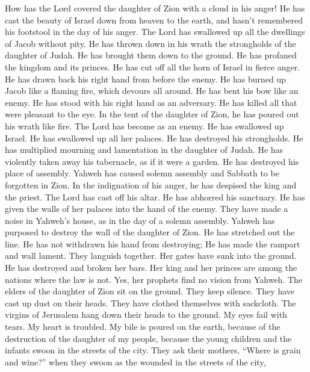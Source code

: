  How has the Lord covered the daughter of Zion with a
cloud in his anger! He has cast the beauty of Israel down from heaven to
the earth, and hasn't remembered his footstool in the day of his anger.
 The Lord has swallowed up all the dwellings of Jacob
without pity. He has thrown down in his wrath the strongholds of the
daughter of Judah. He has brought them down to the ground. He has
profaned the kingdom and its princes.  He has cut off all
the horn of Israel in fierce anger. He has drawn back his right hand
from before the enemy. He has burned up Jacob like a flaming fire, which
devours all around.  He has bent his bow like an enemy. He
has stood with his right hand as an adversary. He has killed all that
were pleasant to the eye. In the tent of the daughter of Zion, he has
poured out his wrath like fire.  The Lord has become as an
enemy. He has swallowed up Israel. He has swallowed up all her palaces.
He has destroyed his strongholds. He has multiplied mourning and
lamentation in the daughter of Judah.  He has violently
taken away his tabernacle, as if it were a garden. He has destroyed his
place of assembly. Yahweh has caused solemn assembly and Sabbath to be
forgotten in Zion. In the indignation of his anger, he has despised the
king and the priest.  The Lord has cast off his altar. He
has abhorred his sanctuary. He has given the walls of her palaces into
the hand of the enemy. They have made a noise in Yahweh's house, as in
the day of a solemn assembly.  Yahweh has purposed to
destroy the wall of the daughter of Zion. He has stretched out the line.
He has not withdrawn his hand from destroying; He has made the rampart
and wall lament. They languish together.  Her gates have
sunk into the ground. He has destroyed and broken her bars. Her king and
her princes are among the nations where the law is not. Yes, her
prophets find no vision from Yahweh.  The elders of the
daughter of Zion sit on the ground. They keep silence. They have cast up
dust on their heads. They have clothed themselves with sackcloth. The
virgins of Jerusalem hang down their heads to the ground.
 My eyes fail with tears. My heart is troubled. My bile
is poured on the earth, because of the destruction of the daughter of my
people, because the young children and the infants swoon in the streets
of the city.  They ask their mothers, ``Where is grain
and wine?'' when they swoon as the wounded in the streets of the city,
